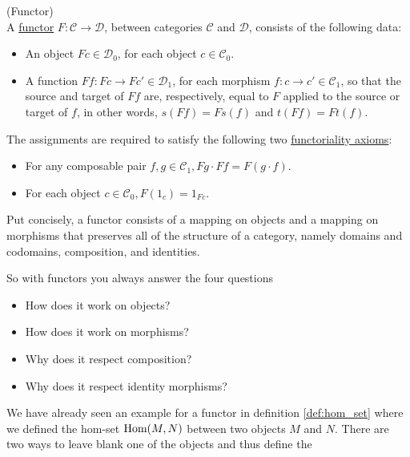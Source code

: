 \begin{definition}{(Functor)}\label{def:functor}\\
\noindent A \ul{functor} $F : \mathcal{C} \rightarrow \mathcal{D}$, between categories $\mathcal{C}$ and $\mathcal{D}$, consists of the
following data:

\begin{itemize}
\item An object $Fc\in\mathcal{D}_{0}$, for each object $c \in \mathcal{C}_{0}$.
\item A function $Ff : Fc \rightarrow Fc' \in \mathcal{D}_{1}$, for each morphism $f : c \rightarrow c' \in \mathcal{C}_{1}$, so that the
source and target of $Ff$ are, respectively, equal to $F$ applied to the source or target of $f$, in other words,
$s(Ff) = Fs(f)$ and $t(Ff) = Ft(f)$.
\end{itemize}

\noindent The assignments are required to satisfy the following two \ul{functoriality axioms}:
\begin{itemize}\label{functoriality}
\item For any composable pair $f, g \in \mathcal{C}_{1}, Fg \cdot Ff = F(g \cdot f)$.
\item For each object $c \in \mathcal{C}_{0}, F(1_{c}) = 1_{Fc}$.
\end{itemize}

Put concisely, a functor consists of a mapping on objects and a mapping on morphisms that preserves all of the structure of a category,
namely domains and codomains, composition, and identities.
\end{definition}

\noindent So with functors you always answer the four questions
\begin{itemize}\label{four_functor_questions}
\item How does it work on objects?
\item How does it work on morphisms?
\item Why does it respect composition?
\item Why does it respect identity morphisms?
\end{itemize}

We have already seen an example for a functor in definition \ref{def:hom_set} where we defined the hom-set $\textup{Hom}(M,N)$ between two
objects $M$ and $N$. There are two ways to leave blank one of the objects and thus define the 

